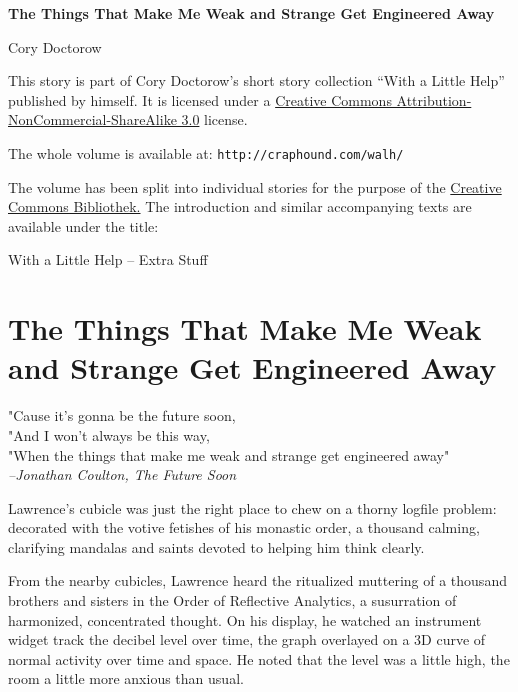 



\begin{center}
\textbf{\huge\textsf{The Things That Make Me Weak and Strange Get 
Engineered Away}}

\medskip
Cory Doctorow

\end{center}

\bigskip

\begin{flushleft}
This story is part of Cory Doctorow’s short story collection
“With a Little Help” published by himself. It is licensed under a
\href{http://creativecommons.org/licenses/by-nc-sa/}
{Creative Commons Attribution-NonCommercial-ShareAlike 3.0} license.

\bigskip

The whole volume is available at:
\texttt{http://craphound.com/walh/}

\medskip

The volume has been split into individual stories for the purpose of the
\href{http://ccbib.org}{Creative Commons Bibliothek.}
The introduction and similar accompanying texts are available under the 
title:
\end{flushleft}
\begin{center}
With a Little Help -- Extra Stuff
\end{center}

\newpage
\section{The Things That Make Me Weak and Strange Get Engineered Away}
\begin{flushleft}
\small
\textsf{"Cause it's gonna be the future soon,\\
"And I won't always be this way,\\
"When the things that make me weak and strange get engineered away"\\
}
\hfill \textit{--Jonathan Coulton, The Future Soon}
\end{flushleft}

Lawrence's cubicle was just the right place to chew on a thorny logfile 
problem: decorated with the votive fetishes of his monastic order, a 
thousand calming, clarifying mandalas and saints devoted to helping him 
think clearly.

From the nearby cubicles, Lawrence heard the ritualized muttering of a 
thousand brothers and sisters in the Order of Reflective Analytics, a 
susurration of harmonized, concentrated thought. On his display, he 
watched an instrument widget track the decibel level over time, the 
graph overlayed on a 3D curve of normal activity over time and space. 
He noted that the level was a little high, the room a little more 
anxious than usual.

